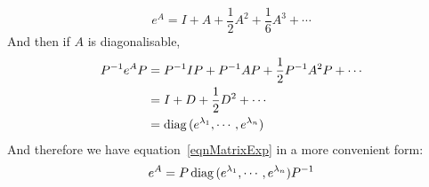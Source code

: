 \documentclass[../Main.tex]{subfiles}
\begin{document}
\begin{equation}
    e^A = I + A + \frac{1}{2} A^2 + \frac{1}{6} A^3 + \cdots
    \label{eqnMatrixExp}
\end{equation}
And then if $A$ is diagonalisable,
\begin{align*}
    P^{-1} e^A P &= P^{-1} I P + P^{-1} A P + \frac{1}{2}P^{-1} A^2 P + \cdots \\
    &= I + D + \frac{1}{2} D^2 + \cdots \\
    &= \operatorname{diag}{(e^{\lambda_1}, \cdots, e^{\lambda_n})}
\end{align*}
And therefore we have equation~\ref{eqnMatrixExp} in a more convenient form:
\begin{equation}
    e^A = P \operatorname{diag}{(e^{\lambda_1}, \cdots, e^{\lambda_n})} P^{-1}
    \label{eqnMatrixExpSimpler}
\end{equation}
\end{document}
